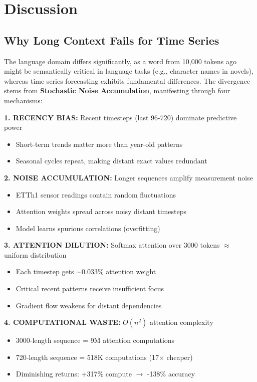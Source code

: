 \documentclass[10pt,twocolumn,letterpaper]{article}
\begin{document}
\section{Discussion}

\subsection{Why Long Context Fails for Time Series}

The language domain differs significantly, as a word from 10,000 tokens ago might be semantically critical in language tasks (e.g., character names in novels), whereas time series forecasting exhibits fundamental differences. The divergence stems from \textbf{Stochastic Noise Accumulation}, manifesting through four mechanisms:

\noindent\textbf{1. RECENCY BIAS:} Recent timesteps (last 96-720) dominate predictive power
\begin{itemize}
    \item Short-term trends matter more than year-old patterns
    \item Seasonal cycles repeat, making distant exact values redundant
\end{itemize}

\noindent\textbf{2. NOISE ACCUMULATION:} Longer sequences amplify measurement noise
\begin{itemize}
    \item ETTh1 sensor readings contain random fluctuations
    \item Attention weights spread across noisy distant timesteps
    \item Model learns spurious correlations (overfitting)
\end{itemize}

\noindent\textbf{3. ATTENTION DILUTION:} Softmax attention over 3000 tokens $\approx$ uniform distribution
\begin{itemize}
    \item Each timestep gets $\sim$0.033\% attention weight
    \item Critical recent patterns receive insufficient focus
    \item Gradient flow weakens for distant dependencies
\end{itemize}

\noindent\textbf{4. COMPUTATIONAL WASTE:} $O(n^2)$ attention complexity
\begin{itemize}
    \item 3000-length sequence = 9M attention computations
    \item 720-length sequence = 518K computations (17$\times$ cheaper)
    \item Diminishing returns: +317\% compute $\rightarrow$ -138\% accuracy
\end{itemize}
\end{document}
